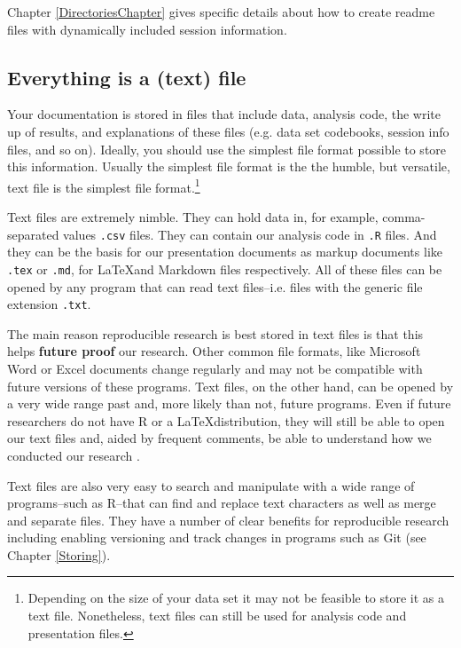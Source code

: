 \noindent Chapter \ref{DirectoriesChapter} gives specific details about how to create readme files with dynamically included session information.

\subsection{Everything is a (text) file}

Your documentation is stored in files that include data, analysis code, the write up of results, and explanations of these files (e.g. data set codebooks, session info files, and so on). Ideally, you should use the simplest file format possible to store this information. Usually the simplest file format is the the humble, but versatile, text file is the simplest file format.\footnote{Depending on the size of your data set it may not be feasible to store it as a text file. Nonetheless, text files can still be used for analysis code and presentation files.} 

Text files are extremely nimble. They can hold data in, for example, comma-separated values {\tt{.csv}}  files. They can contain our analysis code in {\tt{.R}} files. And they can be the basis for our presentation documents as markup documents like {\tt{.tex}} or {\tt{.md}}, for \LaTeX and Markdown files respectively. All of these files can be opened by any program that can read text files--i.e. files with the generic file extension {\tt{.txt}}. 

The main reason reproducible research is best stored in text files is that this helps {\bf{future proof}} our research. Other common file formats, like Microsoft Word  or Excel  documents change regularly and may not be compatible with future versions of these programs. Text files, on the other hand, can be opened by a very wide range past and, more likely than not, future programs. Even if future researchers do not have R or a \LaTeX distribution, they will still be able to open our text files and, aided by frequent comments, be able to understand how we conducted our research \cite[3]{Bowers2011}.

Text files are also very easy to search and manipulate with a wide range of programs--such as R--that can find and replace text characters as well as merge and separate files. They have a number of clear benefits for reproducible research including enabling versioning and track changes in programs such as Git (see Chapter \ref{Storing}).   

